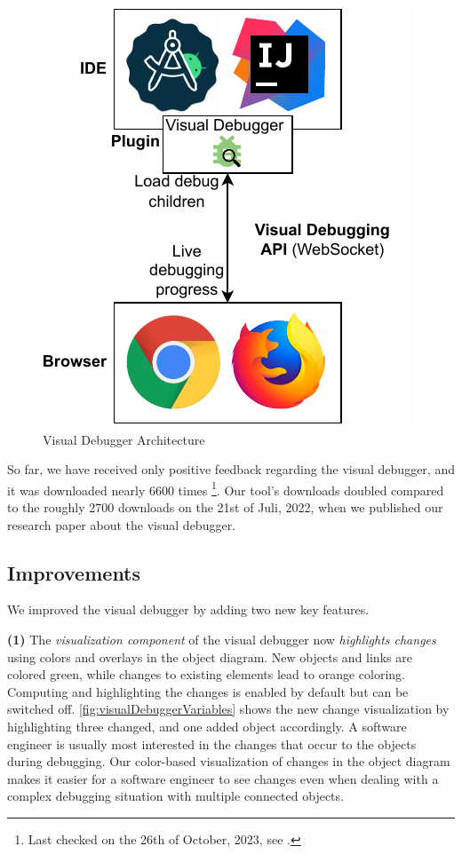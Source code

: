 \documentclass[sigconf]{acmart}
\begin{document}
\begin{figure}[ht]
  \centering
  \includegraphics[width=0.7\linewidth]{images/visual-debugger.pdf}
  \caption{Visual Debugger Architecture}
\end{figure}

So far, we have received only positive feedback regarding the visual debugger, and it was downloaded nearly 6600 times \footnote{Last checked on the 26th of October, 2023, see \cite{timkrauterVisualDebuggerIntelliJ2023}.}.
Our tool's downloads doubled compared to the roughly 2700 downloads on the 21st of Juli, 2022, when we published our research paper \cite{krauterVisualDebuggerTool2022} about the visual debugger.

\subsection{Improvements}
We improved the visual debugger by adding two new key features.

\textbf{(1)} The \textit{visualization component} of the visual debugger now \textit{highlights changes} using colors and overlays in the object diagram.
New objects and links are colored green, while changes to existing elements lead to orange coloring.
Computing and highlighting the changes is enabled by default but can be switched off.
\autoref{fig:visualDebuggerVariables} shows the new change visualization by highlighting three changed, and one added object accordingly.
A software engineer is usually most interested in the changes that occur to the objects during debugging.
Our color-based visualization of changes in the object diagram makes it easier for a software engineer to see changes even when dealing with a complex debugging situation with multiple connected objects.
\end{document}
